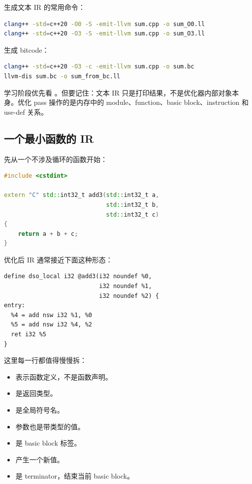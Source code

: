 生成文本 IR 的常用命令：

\begin{lstlisting}[language=bash]
clang++ -std=c++20 -O0 -S -emit-llvm sum.cpp -o sum_O0.ll
clang++ -std=c++20 -O3 -S -emit-llvm sum.cpp -o sum_O3.ll
\end{lstlisting}

生成 bitcode：

\begin{lstlisting}[language=bash]
clang++ -std=c++20 -O3 -c -emit-llvm sum.cpp -o sum.bc
llvm-dis sum.bc -o sum_from_bc.ll
\end{lstlisting}

学习阶段优先看 。但要记住：文本 IR 只是打印结果，不是优化器内部对象本身。优化 pass 操作的是内存中的 module、function、basic block、instruction 和 use-def 关系。

\subsection{一个最小函数的 IR}

先从一个不涉及循环的函数开始：

\begin{lstlisting}[language=C++]
#include <cstdint>

extern "C" std::int32_t add3(std::int32_t a,
                             std::int32_t b,
                             std::int32_t c)
{
    return a + b + c;
}
\end{lstlisting}

优化后 IR 通常接近下面这种形态：

\begin{lstlisting}
define dso_local i32 @add3(i32 noundef %0,
                           i32 noundef %1,
                           i32 noundef %2) {
entry:
  %4 = add nsw i32 %1, %0
  %5 = add nsw i32 %4, %2
  ret i32 %5
}
\end{lstlisting}

这里每一行都值得慢慢拆：

\begin{itemize}
  \item {} 表示函数定义，不是函数声明。
  \item {} 是返回类型。
  \item {} 是全局符号名。
  \item 参数也是带类型的值。
  \item {} 是 basic block 标签。
  \item {} 产生一个新值。
  \item {} 是 terminator，结束当前 basic block。
\end{itemize}

